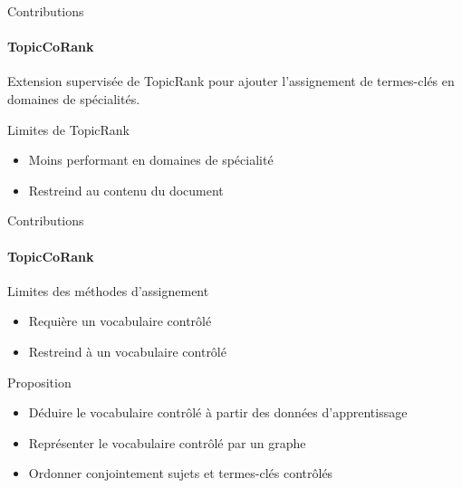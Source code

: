 \begin{frame}{Contributions}\framesubtitle{TopicCoRank}
  Extension supervisée de TopicRank pour ajouter l'assignement de termes-clés en
  domaines de spécialités.

  \vspace{1em}

  \begin{alertblock}{Limites de TopicRank}
    \begin{itemize}
      \item{Moins performant en domaines de spécialité}
      \item{Restreind au contenu du document}
    \end{itemize}
  \end{alertblock}
\end{frame}

\begin{frame}{Contributions}\framesubtitle{TopicCoRank}
  \begin{alertblock}{Limites des méthodes d'assignement}
    \begin{itemize}
      \item{Requière un vocabulaire contrôlé}
      \item{Restreind à un vocabulaire contrôlé}
    \end{itemize}
  \end{alertblock}

  \vspace{1em}

  \begin{block}{Proposition}
    \begin{itemize}
      \item{Déduire le vocabulaire contrôlé à partir des données
            d'apprentissage}
      \item{Représenter le vocabulaire contrôlé par un graphe}
      \item{Ordonner conjointement sujets et termes-clés contrôlés}
    \end{itemize}
  \end{block}
\end{frame}

